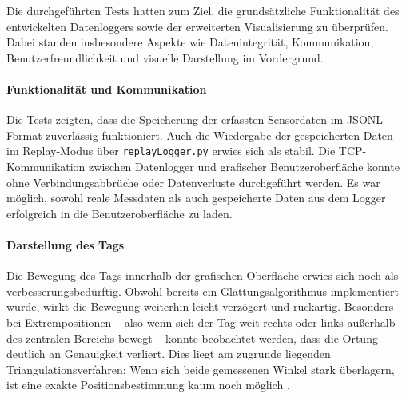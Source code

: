 \documentclass[a4paper, 12pt]{article} %
\begin{document}
Die durchgeführten Tests hatten zum Ziel, die grundsätzliche Funktionalität des entwickelten Datenloggers sowie der erweiterten Visualisierung zu 
überprüfen. Dabei standen insbesondere Aspekte wie Datenintegrität, Kommunikation, Benutzerfreundlichkeit und visuelle Darstellung im Vordergrund.

\paragraph{Funktionalität und Kommunikation}
Die Tests zeigten, dass die Speicherung der erfassten Sensordaten im \ac{JSONL}-Format zuverlässig funktioniert. Auch die Wiedergabe der gespeicherten Daten 
im Replay-Modus über \texttt{replayLogger.py} erwies sich als stabil. Die \ac{TCP}-Kommunikation zwischen Datenlogger und grafischer Benutzeroberfläche konnte 
ohne Verbindungsabbrüche oder Datenverluste durchgeführt werden. Es war möglich, sowohl reale Messdaten als auch gespeicherte Daten aus dem Logger 
erfolgreich in die Benutzeroberfläche zu laden.

\paragraph{Darstellung des Tags}
Die Bewegung des Tags innerhalb der grafischen Oberfläche erwies sich noch als verbesserungsbedürftig. Obwohl bereits ein Glättungsalgorithmus 
implementiert wurde, wirkt die Bewegung weiterhin leicht verzögert und ruckartig. Besonders bei Extrempositionen – also wenn sich der Tag weit 
rechts oder links außerhalb des zentralen Bereichs bewegt – konnte beobachtet werden, dass die Ortung deutlich an Genauigkeit verliert. Dies liegt
am zugrunde liegenden Triangulationsverfahren: Wenn sich beide gemessenen Winkel stark überlagern, ist eine exakte Positionsbestimmung kaum noch 
möglich \cite{triangulation_geometry}.
\end{document}
